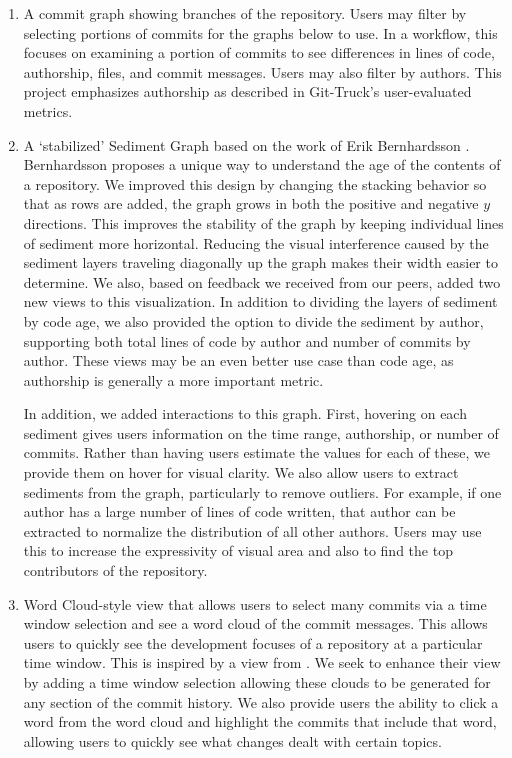\documentclass[12 pt]{article}
\begin{document}
\begin{enumerate}
    \item A commit graph showing branches of the repository. Users may filter by
        selecting portions of commits for the graphs below to use. In a workflow, this
        focuses on examining a portion of commits to see differences in lines of code, authorship,
        files, and commit messages. Users may also filter by authors. This project
        emphasizes authorship as described in Git-Truck's user-evaluated metrics.
    \item A `stabilized' Sediment Graph based on the work of
        Erik Bernhardsson \cite{gitoftheseus}.
        Bernhardsson proposes a unique way to understand the age of the contents of a
        repository. We improved this design by changing the stacking behavior so that as rows
        are added, the graph grows in both the positive and negative $y$ directions.
        This improves the stability of the graph by keeping
        individual lines of sediment more horizontal. Reducing the visual
        interference caused by the sediment layers traveling diagonally up the
        graph makes their width easier to determine.
        We also, based on feedback we received from our peers, added two new views to this
        visualization.
        In addition to dividing the layers of sediment by code
        age, we also provided the option to divide the sediment by author,
        supporting both total lines of code by author and number of commits by
        author. These views may be an even better use case than code age, as
        authorship is generally a more important metric.

        In addition, we added interactions to this graph. First, hovering on each sediment
        gives users information on the time range, authorship, or number of commits. Rather
        than having users estimate the values for each of these, we provide them on hover for
        visual clarity. We also allow users to extract sediments from the graph, particularly to
        remove outliers. For example, if one author has a large number of lines of code written,
        that author can be extracted to normalize the distribution of all other authors. Users may
        use this to increase the expressivity of visual area and also to find
        the top contributors of the repository.
\item Word Cloud-style view that allows users to select
        many commits via a time window selection and see a word cloud of
        the commit messages. This allows users to quickly see the
        development focuses of a repository at a particular time window. This is
        inspired by a view from \cite{githru}. We seek to enhance their view by adding a time
        window selection allowing these clouds to be generated for any section
        of the commit history. We also provide users the ability to click a word
        from the word cloud and highlight the commits that include that
        word, allowing users to quickly see what changes dealt with certain
        topics.


\end{enumerate}
\end{document}
